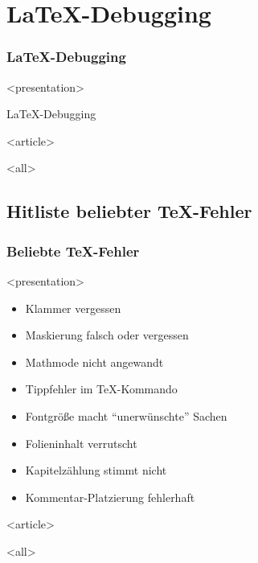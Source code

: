 
\section{LaTeX-Debugging}

\begin{frame}[fragile]
\frametitle<presentation>{LaTeX-Debugging}




\mode
<presentation>

        \begin{center}
        \huge{LaTeX-Debugging}
        \end{center}

\mode
<article>


\mode
<all>

\end{frame}
\newpage

\subsection{Hitliste beliebter TeX-Fehler}
\begin{frame}[fragile]
\frametitle<presentation>{Beliebte TeX-Fehler}


\mode
<presentation>

\begin{itemize}
\item Klammer vergessen
\item Maskierung falsch oder vergessen
\item Mathmode nicht angewandt
\item Tippfehler im TeX-Kommando
\item Fontgröße macht "`unerwünschte"' Sachen
\item Folieninhalt verrutscht
\item Kapitelzählung stimmt nicht
\item Kommentar-Platzierung fehlerhaft
\end{itemize}

\mode
<article>

\mode
<all>

\end{frame}
\newpage


